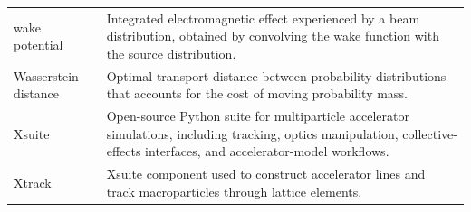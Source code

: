 \begin{longtable}{@{}p{}@{}p{}@{}}
wake potential & Integrated electromagnetic effect experienced by a beam distribution, obtained by convolving the wake function with the source distribution.\\
Wasserstein distance & Optimal-transport distance between probability distributions that accounts for the cost of moving probability mass.\\
\noalign{\vskip\baselineskip}
Xsuite & Open-source Python suite for multiparticle accelerator simulations, including tracking, optics manipulation, collective-effects interfaces, and accelerator-model workflows.\\
Xtrack & Xsuite component used to construct accelerator lines and track macroparticles through lattice elements.\\
\end{longtable}
\endgroup
